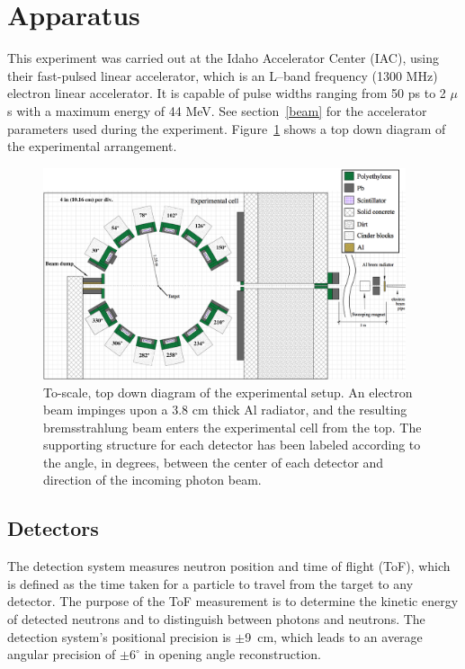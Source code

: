 
\section{Apparatus}
This experiment was carried out at the Idaho Accelerator Center (IAC), using their fast-pulsed linear accelerator, which is an L--band frequency (1300 MHz) electron linear accelerator.
It is capable of pulse widths ranging from 50 ps to 2 $\mu$s with a maximum energy of 44 MeV.
See section~\ref{beam} for the accelerator parameters used during the experiment.
Figure~\ref{fig:Facility} shows a top down diagram of the experimental arrangement.

\begin{figure}[h]
\centering
\includegraphics[width=0.95\textwidth]{Content/Methods/ExpArangment.jpg}
\caption{To-scale, top down diagram of the experimental setup.
An electron beam impinges upon a 3.8 cm thick Al radiator, and the resulting bremsstrahlung beam enters the experimental cell from the top.
The supporting structure for each detector has been labeled according to the angle, in degrees, between the center of each detector and direction of the incoming photon beam.
}
\label{fig:Facility}
\end{figure}
\subsection{Detectors}
\label{subsection:detectors}
The detection system measures neutron position and time of flight (ToF), which is defined as the time taken for a particle to travel from the target to any detector.
The purpose of the ToF measurement is to determine the kinetic energy of detected neutrons and to distinguish between photons and neutrons.
The detection system's positional precision is $\pm$9~cm, which leads to an average angular precision of $\pm6^{\circ}$ in opening angle reconstruction.

